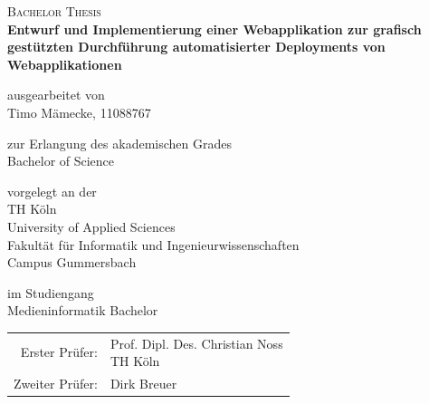 \begin{titlepage}

  \begin{center}
    \vspace*{-4cm}
    \noindent{}
    \vspace*{1.4cm}
  \end{center}

    \begin{center}
      \textsc{\Large{Bachelor Thesis}} \\
      \vspace{1cm}
      \LARGE{\textbf{Entwurf und Implementierung einer Webapplikation zur grafisch gestützten Durchführung automatisierter Deployments von Webapplikationen}}

      \vspace{1cm}

      \normalsize{ausgearbeitet von} \\
      \Large{Timo Mämecke, 11088767}

      \normalsize{zur Erlangung des akademischen Grades} \\
      \Large{Bachelor of Science}

      \normalsize{vorgelegt an der} \\
      \Large{TH Köln}\\
      \Large{University of Applied Sciences}\\
      \Large{Fakultät für Informatik und Ingenieurwissenschaften}\\
      \Large{Campus Gummersbach}

      \normalsize{im Studiengang} \\
      \Large{Medieninformatik Bachelor}

      \vspace{1cm}

      \large{
        \begin{tabular}{ r l }
          Erster Prüfer: & \makecell[lt]{Prof. Dipl. Des. Christian Noss\\\small{TH Köln}\vspace{0.2cm}} \\
          Zweiter Prüfer: & Dirk Breuer
        \end{tabular}
      }

      \vspace{1cm}


\end{center}
\end{titlepage}

